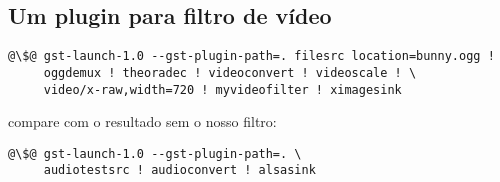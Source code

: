 \subsection*{Um plugin para filtro de vídeo}





\begin{lstlisting}[style=command]
@\$@ gst-launch-1.0 --gst-plugin-path=. filesrc location=bunny.ogg ! 
     oggdemux ! theoradec ! videoconvert ! videoscale ! \
     video/x-raw,width=720 ! myvideofilter ! ximagesink
\end{lstlisting}

\noindent compare com o resultado sem o nosso filtro:
\begin{lstlisting}[style=command]
@\$@ gst-launch-1.0 --gst-plugin-path=. \
     audiotestsrc ! audioconvert ! alsasink
\end{lstlisting}

